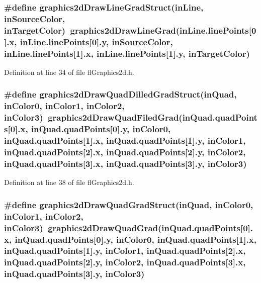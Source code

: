 \subsubsection{\setlength{\rightskip}{0pt plus 5cm}\#define graphics2d\-Draw\-Line\-Grad\-Struct(in\-Line, in\-Source\-Color, in\-Target\-Color)~graphics2d\-Draw\-Line\-Grad(in\-Line.line\-Points[0].x, in\-Line.line\-Points[0].y, in\-Source\-Color, in\-Line.line\-Points[1].x, in\-Line.line\-Points[1].y, in\-Target\-Color)}\label{flGraphics2d_8h_b80fb0cd420ffd79797b32f4cc97ccd0}




Definition at line 34 of file fl\-Graphics2d.h.
\subsubsection{\setlength{\rightskip}{0pt plus 5cm}\#define graphics2d\-Draw\-Quad\-Dilled\-Grad\-Struct(in\-Quad, in\-Color0, in\-Color1, in\-Color2, in\-Color3)~graphics2d\-Draw\-Quad\-Filed\-Grad(in\-Quad.quad\-Points[0].x, in\-Quad.quad\-Points[0].y, in\-Color0, in\-Quad.quad\-Points[1].x, in\-Quad.quad\-Points[1].y, in\-Color1, in\-Quad.quad\-Points[2].x, in\-Quad.quad\-Points[2].y, in\-Color2, in\-Quad.quad\-Points[3].x, in\-Quad.quad\-Points[3].y, in\-Color3)}\label{flGraphics2d_8h_cbee51cf47c68e9fc054548b1e631881}




Definition at line 38 of file fl\-Graphics2d.h.
\subsubsection{\setlength{\rightskip}{0pt plus 5cm}\#define graphics2d\-Draw\-Quad\-Grad\-Struct(in\-Quad, in\-Color0, in\-Color1, in\-Color2, in\-Color3)~graphics2d\-Draw\-Quad\-Grad(in\-Quad.quad\-Points[0].x, in\-Quad.quad\-Points[0].y, in\-Color0, in\-Quad.quad\-Points[1].x, in\-Quad.quad\-Points[1].y, in\-Color1, in\-Quad.quad\-Points[2].x, in\-Quad.quad\-Points[2].y, in\-Color2, in\-Quad.quad\-Points[3].x, in\-Quad.quad\-Points[3].y, in\-Color3)}\label{flGraphics2d_8h_bdb9173a735503a3af7e5b62a8833c03}





